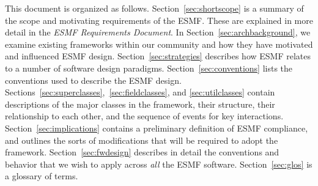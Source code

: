 This document is organized as follows.  Section~\ref{sec:shortscope} is a summary of the 
scope and motivating requirements of the ESMF.  These are explained in more detail in 
the {\it ESMF Requirements Document}.  In Section~\ref{sec:archbackground}, 
we examine existing frameworks within our community and how they have motivated
and influenced ESMF design.  Section~\ref{sec:strategies} describes how ESMF relates 
to a number of software design paradigms.  Section~\ref{sec:conventions} lists the
conventions used to describe the ESMF design.
Sections~\ref{sec:superclasses},~\ref{sec:fieldclasses}, and
\ref{sec:utilclasses} contain descriptions of the 
major classes in the framework, their structure, their relationship to each other, 
and the sequence of events for key interactions.  Section~\ref{sec:implications} contains a preliminary definition of ESMF compliance, and outlines the sorts
of modifications that will be required to adopt the framework.  Section~\ref{sec:fwdesign} 
describes in detail the conventions and behavior
that we wish to apply across {\it all} the ESMF software.  Section~\ref{sec:glos} is a 
glossary of terms.








